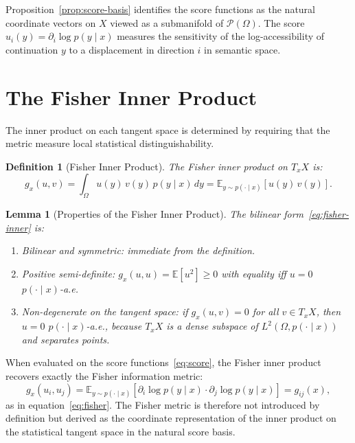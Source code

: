 \documentclass[12pt, oneside]{book}
\theoremstyle{plain-flyxion}
\newtheorem{lemma}[theorem]{Lemma}
\theoremstyle{definition-flyxion}
\newtheorem{definition}[theorem]{Definition}
\begin{document}
Proposition~\ref{prop:score-basis} identifies the score functions as the natural
coordinate vectors on $X$ viewed as a submanifold of $\mathcal{P}(\Omega)$. The score
$u_i(y) = \partial_i \log p(y\mid x)$ measures the sensitivity of the log-accessibility
of continuation $y$ to a displacement in direction $i$ in semantic space.

\section{The Fisher Inner Product}

The inner product on each tangent space is determined by requiring that the metric measure
local statistical distinguishability.

\begin{definition}[Fisher Inner Product]\label{def:fisher-inner}
The Fisher inner product on $T_x X$ is:
\begin{equation}\label{eq:fisher-inner}
g_x(u, v) = \int_\Omega u(y)\, v(y)\, p(y \mid x)\, dy
= \mathbb{E}_{y \sim p(\cdot\mid x)}[u(y)\, v(y)].
\end{equation}
\end{definition}

\begin{lemma}[Properties of the Fisher Inner Product]\label{lem:fisher-props}
The bilinear form~\eqref{eq:fisher-inner} is:
\begin{enumerate}
  \item[(i)] \emph{Bilinear and symmetric}: immediate from the definition.
  \item[(ii)] \emph{Positive semi-definite}: $g_x(u,u) = \mathbb{E}[u^2] \geq 0$ with
    equality iff $u = 0$ $p(\cdot\mid x)$-a.e.
  \item[(iii)] \emph{Non-degenerate on the tangent space}: if $g_x(u,v) = 0$ for all
    $v \in T_x X$, then $u = 0$ $p(\cdot\mid x)$-a.e., because $T_x X$ is a dense
    subspace of $L^2(\Omega, p(\cdot\mid x))$ and separates points.
\end{enumerate}
\end{lemma}

When evaluated on the score functions~\eqref{eq:score}, the Fisher inner product
recovers exactly the Fisher information metric:
\[
g_x(u_i, u_j) = \mathbb{E}_{y\sim p(\cdot\mid x)}[\partial_i \log p(y\mid x)\cdot
\partial_j \log p(y\mid x)] = g_{ij}(x),
\]
as in equation~\eqref{eq:fisher}. The Fisher metric is therefore not introduced by
definition but derived as the coordinate representation of the inner product on the
statistical tangent space in the natural score basis.
\end{document}
